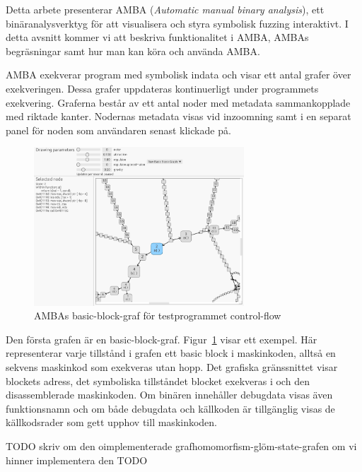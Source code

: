 Detta arbete presenterar AMBA (\emph{Automatic manual binary analysis}), ett
binäranalysverktyg för att visualisera och styra symbolisk fuzzing interaktivt.
I detta avsnitt kommer vi att beskriva funktionalitet i AMBA, AMBAs
begräsningar samt hur man kan köra och använda AMBA.

AMBA exekverar program med symbolisk indata och visar ett antal grafer
över exekveringen. Dessa grafer uppdateras kontinuerligt under programmets
exekvering. Graferna består av ett antal noder med metadata sammankopplade
med riktade kanter. Nodernas metadata visas vid inzoomning samt i en separat
panel för noden som användaren senast klickade på.

\begin{figure}
    \centering
    \includegraphics[width=0.7\textwidth]{figures/graph_basic_block.png}
    \caption{
        AMBAs basic-block-graf för testprogrammet control-flow
    }\label{fig:graf-basic}
\end{figure}

Den första grafen är en basic-block-graf. Figur~\ref{fig:graf-basic} visar ett
exempel. Här representerar varje tillstånd i grafen ett basic block i
maskinkoden, alltså en sekvens maskinkod som exekveras utan hopp. Det grafiska
gränssnittet visar blockets adress, det symboliska tillståndet blocket exekveras
i och den disassemblerade maskinkoden. Om binären innehåller debugdata visas
även funktionsnamn och om både debugdata och källkoden är tillgänglig visas de
källkodsrader som gett upphov till maskinkoden.

TODO skriv om den oimplementerade grafhomomorfism-glöm-state-grafen om vi hinner
implementera den TODO

